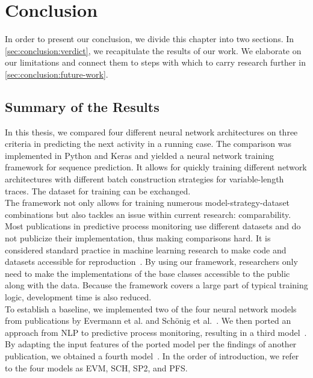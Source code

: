 \chapter{Conclusion} \label{chap:conclusion}
In order to present our conclusion, we divide this chapter into two sections.
In \autoref{sec:conclusion:verdict}, we recapitulate the results of our work.
We elaborate on our limitations and connect them to steps with which to carry research further in \autoref{sec:conclusion:future-work}.

\section{Summary of the Results} \label{sec:conclusion:verdict}
In this thesis, we compared four different neural network architectures on three criteria in predicting the next activity in a running case.
The comparison was implemented in Python and Keras and yielded a neural network training framework for sequence prediction.
It allows for quickly training different network architectures with different batch construction strategies for variable-length traces.
The dataset for training can be exchanged.\\

\noindent The framework not only allows for training numerous model-strategy-dataset combinations but also tackles an issue within current research: comparability.
Most publications in predictive process monitoring use different datasets and do not publicize their implementation, thus making comparisons hard.
It is considered standard practice in machine learning research to make code and datasets accessible for reproduction~\cite{russell1995modern}.
By using our framework, researchers only need to make the implementations of the base classes accessible to the public along with the data.
Because the framework covers a large part of typical training logic, development time is also reduced.\\

To establish a baseline, we implemented two of the four neural network models from publications by Evermann et al. and Schönig et al.~\cite{evermann2016, schoenig2018}.
We then ported an approach from NLP to predictive process monitoring, resulting in a third model~\cite{shibata2016bipartite}.
By adapting the input features of the ported model per the findings of another publication, we obtained a fourth model~\cite{klinkmuller2018reliablemonitoring}.
In the order of introduction, we refer to the four models as EVM, SCH, SP2, and PFS.\\

